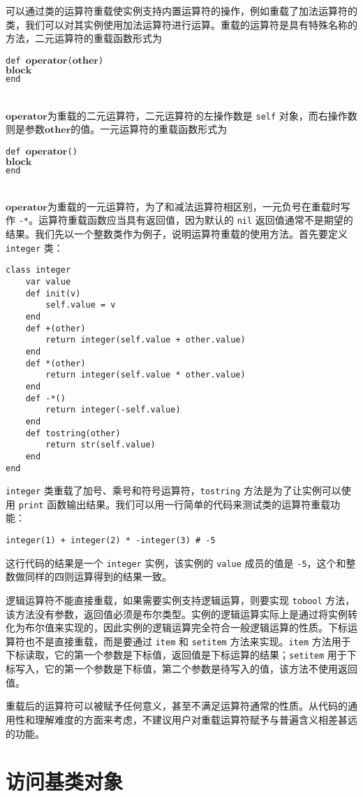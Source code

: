 可以通过类的运算符重载使实例支持内置运算符的操作，例如重载了加法运算符的类，我们可以对其实例使用加法运算符进行运算。重载的运算符是具有特殊名称的方法，二元运算符的重载函数形式为
\begin{algorithm}
    \texttt{def }$\bm{operator}$\texttt{(}$\bm{other}$\texttt{)}\\
    \qquad $\bm{block}$ \\
    \texttt{end}
\end{algorithm}\vspace{-0.6em}\\
$\bm{operator}$为重载的二元运算符，二元运算符的左操作数是 \texttt{self} 对象，而右操作数则是参数$\bm{other}$的值。一元运算符的重载函数形式为
\begin{algorithm}
    \texttt{def }$\bm{operator}$\texttt{()}\\
    \qquad $\bm{block}$ \\
    \texttt{end}
\end{algorithm}\vspace{-0.6em}\\
$\bm{operator}$为重载的一元运算符，为了和减法运算符相区别，一元负号在重载时写作 \texttt{-*}。运算符重载函数应当具有返回值，因为默认的 \texttt{nil} 返回值通常不是期望的结果。我们先以一个整数类作为例子，说明运算符重载的使用方法。首先要定义 \texttt{integer} 类：
\begin{lstlisting}[language=berry]
class integer
    var value
    def init(v)
        self.value = v
    end
    def +(other)
        return integer(self.value + other.value)
    end
    def *(other)
        return integer(self.value * other.value)
    end
    def -*()
        return integer(-self.value)
    end
    def tostring(other)
        return str(self.value)
    end
end
\end{lstlisting}
\texttt{integer} 类重载了加号、乘号和符号运算符，\texttt{tostring} 方法是为了让实例可以使用 \texttt{print} 函数输出结果。我们可以用一行简单的代码来测试类的运算符重载功能：
\begin{lstlisting}[language=berry, numbers=none]
integer(1) + integer(2) * -integer(3) # -5
\end{lstlisting}
这行代码的结果是一个 \texttt{integer} 实例，该实例的 \texttt{value} 成员的值是 \texttt{-5}，这个和整数做同样的四则运算得到的结果一致。

逻辑运算符不能直接重载，如果需要实例支持逻辑运算，则要实现 \texttt{tobool} 方法，该方法没有参数，返回值必须是布尔类型。实例的逻辑运算实际上是通过将实例转化为布尔值来实现的，因此实例的逻辑运算完全符合一般逻辑运算的性质。下标运算符也不是直接重载，而是要通过 \texttt{item} 和 \texttt{setitem} 方法来实现。\texttt{item} 方法用于下标读取，它的第一个参数是下标值，返回值是下标运算的结果；\texttt{setitem} 用于下标写入，它的第一个参数是下标值，第二个参数是待写入的值，该方法不使用返回值。

重载后的运算符可以被赋予任何意义，甚至不满足运算符通常的性质。从代码的通用性和理解难度的方面来考虑，不建议用户对重载运算符赋予与普遍含义相差甚远的功能。

\section{访问基类对象}
